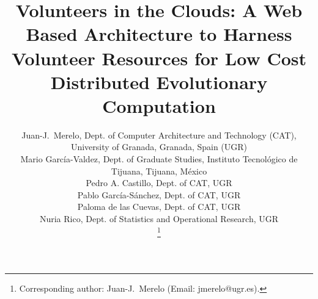 \documentclass[journal,onecolumn]{IEEEtran}
\begin{document}
\title{Volunteers in the Clouds: A Web Based Architecture to Harness Volunteer Resources 
for Low Cost Distributed Evolutionary Computation }


\author{Juan-J.~Merelo, Dept. of Computer Architecture and Technology
  (CAT), University of Granada, Granada, Spain (UGR)\\
Mario Garc\'ia-Valdez, Dept. of Graduate Studies, Instituto
Tecnológico de Tijuana, Tijuana, M\'exico\\
Pedro A. Castillo, Dept. of CAT, UGR\\
Pablo Garc\'ia-S\'anchez, Dept. of CAT, UGR\\
Paloma de las Cuevas, Dept. of CAT, UGR\\Nuria Rico, Dept. of Statistics and Operational Research, UGR%

\thanks{Corresponding author: Juan-J.~Merelo (Email: jmerelo@ugr.es).}%
}

\maketitle
\end{document}
